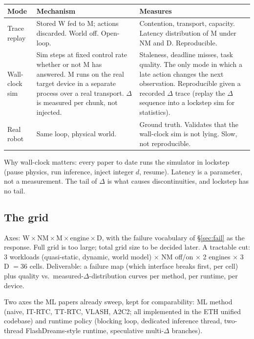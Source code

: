 \documentclass[10pt,letterpaper]{article}
\begin{document}
\begin{center}
\small
\begin{tabular}{@{}lL{5.2cm}L{6.1cm}@{}}
\toprule
Mode & Mechanism & Measures \\
\midrule
Trace replay & Stored W fed to M; actions discarded. World off. Open-loop. & Contention, transport, capacity. Latency distribution of M under NM and D. Reproducible. \\
Wall-clock sim & Sim steps at fixed control rate whether or not M has answered. M runs on the real target device in a separate process over a real transport. $\Delta$ is measured per chunk, not injected. & Staleness, deadline misses, task quality. The only mode in which a late action changes the next observation. Reproducible given a recorded $\Delta$ trace (replay the $\Delta$ sequence into a lockstep sim for statistics). \\
Real robot & Same loop, physical world. & Ground truth. Validates that the wall-clock sim is not lying. Slow, not reproducible. \\
\bottomrule
\end{tabular}
\end{center}

Why wall-clock matters: every paper to date runs the simulator in lockstep (pause physics, run inference, inject integer $d$, resume). Latency is a parameter, not a measurement. The tail of $\Delta$ is what causes discontinuities, and lockstep has no tail.

\subsection{The grid}

Axes: $\text{W} \times \text{NM} \times \text{M} \times \text{engine} \times \text{D}$, with the failure vocabulary of \S\ref{sec:fail} as the response. Full grid is too large; total grid size to be decided later. A tractable cut: 3 workloads (quasi-static, dynamic, world model) $\times$ NM off/on $\times$ 2 engines $\times$ 3 D $= 36$ cells. Deliverable: a failure map (which interface breaks first, per cell) plus quality vs.\ measured-$\Delta$-distribution curves per method, per runtime, per device.

Two axes the ML papers already sweep, kept for comparability: ML method (naive, IT-RTC, TT-RTC, VLASH, A2C2; all implemented in the ETH unified codebase) and runtime policy (blocking loop, dedicated inference thread, two-thread FlashDreams-style runtime, speculative multi-$\Delta$ branches).
\end{document}
